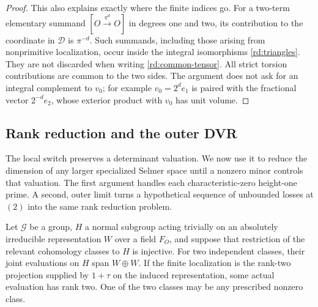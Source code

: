 \begin{proof}
This also explains exactly where the finite indices go.  For a
two-term elementary summand
\([O\xrightarrow{\pi^d}O]\) in degrees one and two, its contribution
to the coordinate in \(\mathcal D\) is \(\pi^{-d}\).
Such summands, including those arising from nonprimitive
localization, occur inside the integral isomorphisms
\eqref{rd:triangles}.  They are not discarded when writing
\eqref{rd:common-tensor}.  All strict torsion contributions are common
to the two sides.  The argument does not ask for an integral
complement to \(v_0\); for example \(v_0=2^de_1\) is paired with
the fractional vector \(2^{-d}e_2\), whose exterior product with
\(v_0\) has unit volume.
\end{proof}

\subsection{Rank reduction and the outer DVR}
\label{rd:outer-subsection}

The local switch preserves a determinant valuation.  We now use it to
reduce the dimension of any larger specialized Selmer space until a
nonzero minor controls that valuation.  The first argument handles each
characteristic-zero height-one prime.  A second, outer limit turns a
hypothetical sequence of unbounded losses at $(2)$ into the same rank
reduction problem.

\begin{lemma}\label{rd:rank-two}
Let \(\mathcal G\) be a group, \(H\) a normal subgroup acting trivially
on an absolutely irreducible representation \(W\) over a field \(F_O\),
and suppose that restriction of the relevant cohomology classes to
\(H\) is injective.  For two independent classes, their joint
evaluations on \(H\) span \(W\oplus W\).  If the finite localization
is the rank-two projection supplied by \(1+\tau\) on the induced
representation, some actual evaluation has rank two.  One of the
two classes may be any prescribed nonzero class.
\end{lemma}

